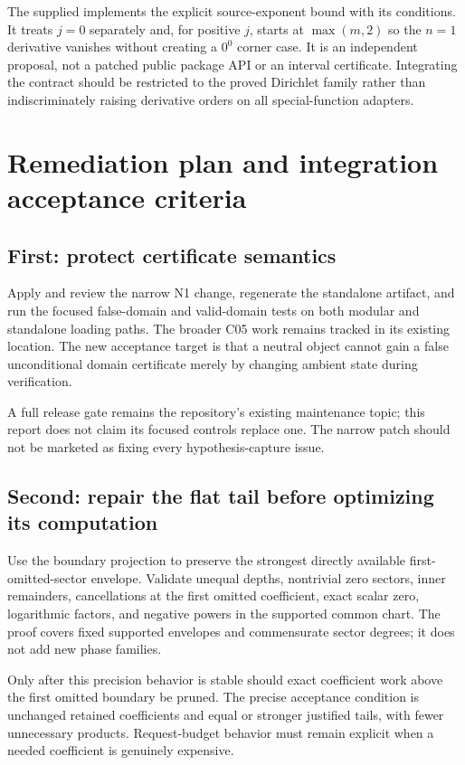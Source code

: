\documentclass[11pt,letterpaper]{article}
\begin{document}
The supplied  implements the explicit
source-exponent bound with its conditions. It treats $j=0$ separately and,
for positive $j$, starts at $\max(m,2)$ so the $n=1$ derivative vanishes without
creating a $0^0$ corner case. It is an independent proposal, not a patched
public package API or an interval certificate. Integrating the contract should
be restricted to the proved Dirichlet family rather than indiscriminately
raising derivative orders on all special-function adapters.

\section{Remediation plan and integration acceptance criteria}
\label{sec:plan}
\subsection{First: protect certificate semantics}
Apply and review the narrow N1 change, regenerate the standalone artifact, and
run the focused false-domain and valid-domain tests on both modular and
standalone loading paths. The broader C05 work remains tracked in its existing
location. The new acceptance target is that a neutral object cannot gain a
false unconditional domain certificate merely by changing ambient state during
verification.

A full release gate remains the repository's existing maintenance topic; this
report does not claim its focused controls replace one. The narrow patch should
not be marketed as fixing every hypothesis-capture issue.

\subsection{Second: repair the flat tail before optimizing its computation}
Use the boundary projection to preserve the strongest directly available
first-omitted-sector envelope. Validate unequal depths, nontrivial zero sectors,
inner remainders, cancellations at the first omitted coefficient, exact scalar
zero, logarithmic factors, and negative powers in the supported common chart.
The proof covers fixed supported envelopes and commensurate sector degrees;
it does not add new phase families.

Only after this precision behavior is stable should exact coefficient work
above the first omitted boundary be pruned. The precise acceptance condition
is unchanged retained coefficients and equal or stronger justified tails,
with fewer unnecessary products. Request-budget behavior must remain explicit
when a needed coefficient is genuinely expensive.
\end{document}
